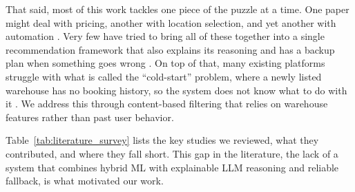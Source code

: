 \documentclass[conference]{IEEEtran}
\begin{document}
That said, most of this work tackles one piece of the puzzle at a time. One paper might deal with pricing, another with location selection, and yet another with automation \cite{b2}. Very few have tried to bring all of these together into a single recommendation framework that also explains its reasoning and has a backup plan when something goes wrong \cite{b3}. On top of that, many existing platforms struggle with what is called the ``cold-start'' problem, where a newly listed warehouse has no booking history, so the system does not know what to do with it \cite{b10}. We address this through content-based filtering that relies on warehouse features rather than past user behavior.

Table~\ref{tab:literature_survey} lists the key studies we reviewed, what they contributed, and where they fall short. This gap in the literature, the lack of a system that combines hybrid ML with explainable LLM reasoning and reliable fallback, is what motivated our work.
\end{document}
